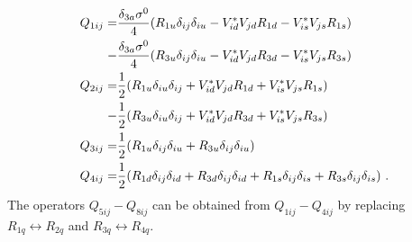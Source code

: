 \begin{align}\label{eq:dependenciesoperators}
	Q_{1ij} =&\frac{\delta_{3a}\sigma^0}{4}(R_{1u}\delta_{ij}\delta_{iu} - V_{id}^*V_{jd}R_{1d} - V_{is}^*V_{js}R_{1s})\notag \\
	-&\frac{\delta_{3a}\sigma^0}{4} (R_{3u}\delta_{ij}\delta_{iu} - V_{id}^*V_{jd}R_{3d} - V_{is}^*V_{js}R_{3s})\notag \\
	Q_{2ij} =&\frac{1}{2}(R_{1u}\delta_{iu}\delta_{ij}+ V_{id}^*V_{jd}R_{1d}+ V_{is}^*V_{js}R_{1s})\notag \\
	-&\frac{1}{2}(R_{3u}\delta_{iu}\delta_{ij} + V_{id}^*V_{jd}R_{3d} + V_{is}^*V_{js}R_{3s})\notag \\
	Q_{3ij} =&\frac{1}{2}(R_{1u}\delta_{ij}\delta_{iu} + R_{3u}\delta_{ij}\delta_{iu})\notag \\
	Q_{4ij} =&\frac{1}{2}(R_{1d}\delta_{ij}\delta_{id} + R_{3d}\delta_{ij}\delta_{id} + R_{1s}\delta_{ij}\delta_{is} + R_{3s}\delta_{ij}\delta_{is}) \ .
\end{align}
The operators $Q_{5ij}-Q_{8ij}$ can be obtained from $Q_{1ij}-Q_{4ij}$ by replacing $R_{1q}\leftrightarrow R_{2q}$ and $R_{3q}\leftrightarrow R_{4q}$.


